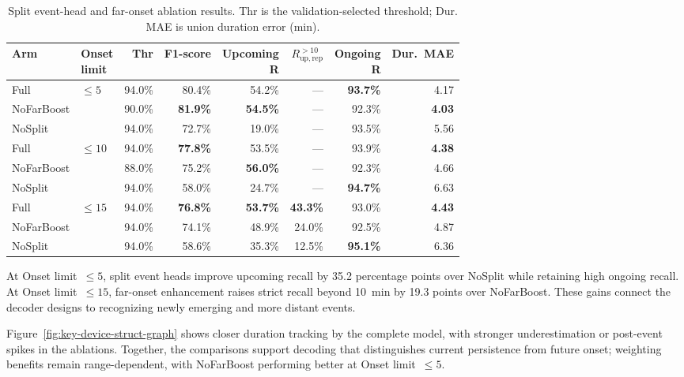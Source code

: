 \begin{table}[!htbp]
\centering
\caption{Split event-head and far-onset ablation results. Thr is the validation-selected threshold; Dur. MAE is union duration error (min).}
\label{tab:decoder-ablation}
\footnotesize
\setlength{\tabcolsep}{3.5pt}
\renewcommand{\arraystretch}{1.08}
\begin{fittable}
\begin{tabular*}{\linewidth}{@{\extracolsep{\fill}}llrrrrrr@{}}
\toprule
Arm & \makecell{Onset\\limit} & Thr & F1-score & \makecell{Upcoming\\R} & $R_{\mathrm{up,rep}}^{>10}$ & \makecell{Ongoing\\R} & Dur.\ MAE \\
\midrule
Full & $\leq5$ & 94.0\% & 80.4\% & 54.2\% & --- & \textbf{93.7\%} & 4.17 \\
NoFarBoost & & 90.0\% & \textbf{81.9\%} & \textbf{54.5\%} & --- & 92.3\% & \textbf{4.03} \\
NoSplit & & 94.0\% & 72.7\% & 19.0\% & --- & 93.5\% & 5.56 \\
\midrule
Full & $\leq10$ & 94.0\% & \textbf{77.8\%} & 53.5\% & --- & 93.9\% & \textbf{4.38} \\
NoFarBoost & & 88.0\% & 75.2\% & \textbf{56.0\%} & --- & 92.3\% & 4.66 \\
NoSplit & & 94.0\% & 58.0\% & 24.7\% & --- & \textbf{94.7\%} & 6.63 \\
\midrule
Full & $\leq15$ & 94.0\% & \textbf{76.8\%} & \textbf{53.7\%} & \textbf{43.3\%} & 93.0\% & \textbf{4.43} \\
NoFarBoost & & 94.0\% & 74.1\% & 48.9\% & 24.0\% & 92.5\% & 4.87 \\
NoSplit & & 94.0\% & 58.6\% & 35.3\% & 12.5\% & \textbf{95.1\%} & 6.36 \\
\bottomrule
\end{tabular*}
\end{fittable}
\end{table}

At Onset limit~$\leq5$, split event heads improve upcoming recall by 35.2 percentage points over NoSplit while retaining high ongoing recall. At Onset limit~$\leq15$, far-onset enhancement raises strict recall beyond 10~min by 19.3 points over NoFarBoost. These gains connect the decoder designs to recognizing newly emerging and more distant events.

Figure~\ref{fig:key-device-struct-graph} shows closer duration tracking by the complete model, with stronger underestimation or post-event spikes in the ablations. Together, the comparisons support decoding that distinguishes current persistence from future onset; weighting benefits remain range-dependent, with NoFarBoost performing better at Onset limit~$\leq5$.

